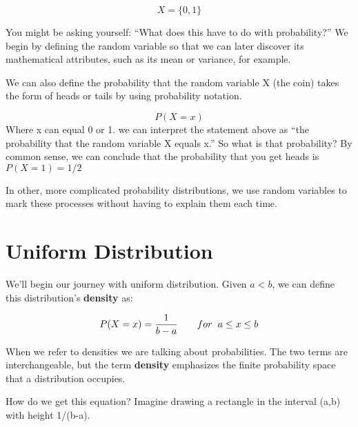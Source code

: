 \documentclass[
]{book}
\begin{document}
\[X = \{0,1\}\]

You might be asking yourself: ``What does this have to do with probability?'' We begin by defining the random variable so that we can later discover its mathematical attributes, such as its mean or variance, for example.

We can also define the probability that the random variable X (the coin) takes the form of heads or tails by using probability notation.

\[P(X = x)\]
Where x can equal 0 or 1. we can interpret the statement above as ``the probability that the random variable X equals x.'' So what is that probability? By common sense, we can conclude that the probability that you get heads is \(P(X=1)=1/2\)

In other, more complicated probability distributions, we use random variables to mark these processes without having to explain them each time.

\hypertarget{Uniform}{%
\section{Uniform Distribution}\label{Uniform}}

We'll begin our journey with uniform distribution. Given \(a < b\), we can define this distribution's \textbf{density} as:

\[ P(X=x) = \frac{1}{b-a}\hspace{0.7cm}for\hspace{0.2cm}a\leq x\leq b \]

When we refer to densities we are talking about probabilities. The two terms are interchangeable, but the term \textbf{density} emphasizes the finite probability space that a distribution occupies.

How do we get this equation? Imagine drawing a rectangle in the interval (a,b) with height 1/(b-a).
\end{document}
